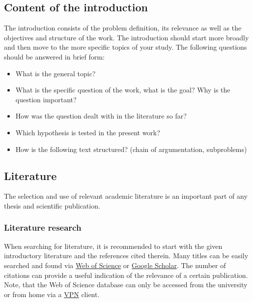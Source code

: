 \documentclass[a4paper,12pt]{article}
\providecommand{\tightlist}{%
  \setlength{\itemsep}{0pt}\setlength{\parskip}{0pt}}
\begin{document}
\hypertarget{content-of-the-introduction}{%
\subsection{Content of the introduction}\label{content-of-the-introduction}}

The introduction consists of the problem definition, its relevance as well as the objectives and structure of the work. The introduction should start more broadly and then move to the more specific topics of your study. The following questions should be answered in brief form:
\begin{itemize}
\tightlist
\item
  What is the general topic?
\item
  What is the specific question of the work, what is the goal? Why is the question important?
\item
  How was the question dealt with in the literature so far?
\item
  Which hypothesis is tested in the present work?
\item
  How is the following text structured? (chain of argumentation, subproblems)
\end{itemize}
\hypertarget{literature}{%
\subsection{Literature}\label{literature}}

The selection and use of relevant academic literature is an important part of any thesis and scientific publication.

\hypertarget{literature-research}{%
\subsubsection{Literature research}\label{literature-research}}

When searching for literature, it is recommended to start with the given introductory literature and the references cited therein. Many titles can be easily searched and found via \href{https://apps.webofknowledge.com/WOS_GeneralSearch_input.do?product=WOS\&search_mode=GeneralSearch\&SID=E4BQAzXmvUw7kPeUIBE\&preferencesSaved=}{Web of Science} or \href{https://scholar.google.de/}{Google Scholar}. The number of citations can provide a useful indication of the relevance of a certain publication. Note, that the Web of Science database can only be accessed from the university or from home via a \href{https://www.rrz.uni-hamburg.de/services/netz/vpn.html}{VPN} client.
\end{document}
